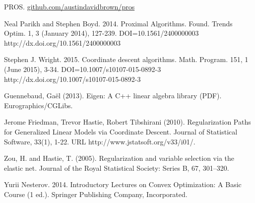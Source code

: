 \documentclass[12pt, a4paper, reqno]{article}
\numberwithin{equation}{section}
\begin{document}
%
%
\begin{thebibliography}{1}

PROS. \href{https://github.com/austindavidbrown/pros}{github.com/austindavidbrown/pros}

Neal Parikh and Stephen Boyd. 2014. Proximal Algorithms. Found. Trends Optim. 1, 3 (January 2014), 127-239. DOI=10.1561/2400000003 http://dx.doi.org/10.1561/2400000003

Stephen J. Wright. 2015. Coordinate descent algorithms. Math. Program. 151, 1 (June 2015), 3-34. DOI=10.1007/s10107-015-0892-3 http://dx.doi.org/10.1007/s10107-015-0892-3

Guennebaud, Gaël (2013). Eigen: A C++ linear algebra library (PDF). Eurographics/CGLibs.

Jerome Friedman, Trevor Hastie, Robert Tibshirani (2010). Regularization Paths for Generalized Linear Models via Coordinate Descent. Journal of Statistical Software, 33(1), 1-22. URL http://www.jstatsoft.org/v33/i01/.

Zou, H. and Hastie, T. (2005). Regularization and variable selection via the elastic net. Journal of the Royal Statistical Society: Series B, 67, 301–320.

Yurii Nesterov. 2014. Introductory Lectures on Convex Optimization: A Basic Course (1 ed.). Springer Publishing Company, Incorporated.

\end{thebibliography}
\end{document}
